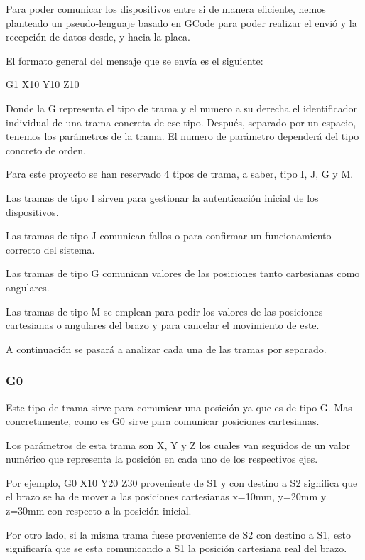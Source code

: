 Para poder comunicar los dispositivos entre si de manera eficiente, hemos planteado un pseudo-lenguaje basado en GCode para poder realizar el envió y la recepción de datos desde, y hacia la placa.

El formato general del mensaje que se envía es el siguiente:

\begin{center}
    {\Large G1 X10 Y10 Z10}
\end{center}

Donde la G representa el tipo de trama y el numero a su derecha el identificador individual de una trama concreta de ese tipo.
Después, separado por un espacio, tenemos los parámetros de la trama. El numero de parámetro dependerá del tipo concreto de orden.

Para este proyecto se han reservado 4 tipos de trama, a saber, tipo I, J, G y M.

Las tramas de tipo I sirven para gestionar la autenticación inicial de los dispositivos.

Las tramas de tipo J comunican fallos o para confirmar un funcionamiento correcto del sistema.

Las tramas de tipo G comunican valores de las posiciones tanto cartesianas como angulares.

Las tramas de tipo M se emplean para pedir los valores de las posiciones cartesianas o angulares del brazo y para cancelar el movimiento de este.

A continuación se pasará a analizar cada una de las tramas por separado.

\subsubsection{G0}
Este tipo de trama sirve para comunicar una posición ya que es de tipo G. Mas concretamente, como es G0 sirve para comunicar posiciones cartesianas.

Los parámetros de esta trama son X, Y y Z los cuales van seguidos de un valor numérico que representa la posición en cada uno de los respectivos ejes.

Por ejemplo, G0 X10 Y20 Z30 proveniente de \ac{S1} y con destino a \ac{S2} significa que el brazo se ha de mover a las posiciones cartesianas x=10mm, y=20mm y z=30mm con respecto a la posición inicial.

Por otro lado, si la misma trama fuese proveniente de \ac{S2} con destino a \ac{S1}, esto significaría que se esta comunicando a \ac{S1} la posición cartesiana real del brazo.

